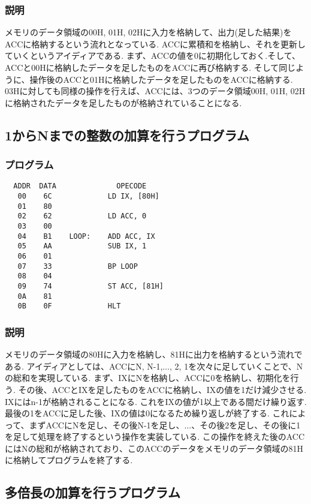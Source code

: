 \documentclass[titlepage]{jsarticle}
\theoremstyle{definition}
\begin{document}
\subsubsection{説明}
メモリのデータ領域の00H, 01H, 02Hに入力を格納して、出力(足した結果)をACCに格納するという流れとなっている.
ACCに累積和を格納し、それを更新していくというアイディアである.
まず、ACCの値を0に初期化しておく.そして、ACCと00Hに格納したデータを足したものをACCに再び格納する.
そして同じように、操作後のACCと01Hに格納したデータを足したものをACCに格納する.
03Hに対しても同様の操作を行えば、ACCには、3つのデータ領域00H, 01H, 02Hに格納されたデータを足したものが格納されていることになる.


\subsection{1からNまでの整数の加算を行うプログラム}

\subsubsection{プログラム}

\begin{lstlisting}
  ADDR  DATA              OPECODE
   00    6C             LD IX, [80H]
   01    80
   02    62             LD ACC, 0
   03    00
   04    B1    LOOP:    ADD ACC, IX
   05    AA             SUB IX, 1
   06    01
   07    33             BP LOOP
   08    04
   09    74             ST ACC, [81H]
   0A    81
   0B    0F             HLT
\end{lstlisting}

\subsubsection{説明}
メモリのデータ領域の80Hに入力を格納し、81Hに出力を格納するという流れである.
アイディアとしては、ACCにN, N-1,$\ldots$, 2, 1を次々に足していくことで、Nの総和を実現している.
まず、IXにNを格納し、ACCに0を格納し、初期化を行う.
その後、ACCとIXを足したものをACCに格納し、IXの値を1だけ減少させる. IXにはn-1が格納されることになる.
これをIXの値が1以上である間だけ繰り返す. 最後の1をACCに足した後、IXの値は0になるため繰り返しが終了する.
これによって、まずACCにNを足し、その後N-1を足し、$\ldots$、その後2を足し、その後に1を足して処理を終了するという操作を実装している.
この操作を終えた後のACCにはNの総和が格納されており、このACCのデータをメモリのデータ領域の81Hに格納してプログラムを終了する.


\subsection{多倍長の加算を行うプログラム}
\end{document}
